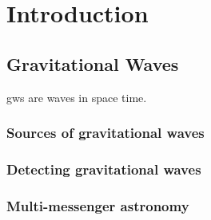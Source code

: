 \chapter{Introduction}
\label{chap:intro}
\chaptoc{}


\newpage
\section{Gravitational Waves}
\label{sec:gw}
\begin{colsection}


\begin{colsection}

\glspl{gw} are waves in space time.

\end{colsection}


\subsection{Sources of gravitational waves}
\label{sec:gw_sources}
\begin{colsection}


\end{colsection}


\subsection{Detecting gravitational waves}
\label{sec:gw_detecting}
\begin{colsection}


\end{colsection}


\subsection{Multi-messenger astronomy}
\label{sec:multimessenger}
\begin{colsection}


\end{colsection}


\end{colsection}

